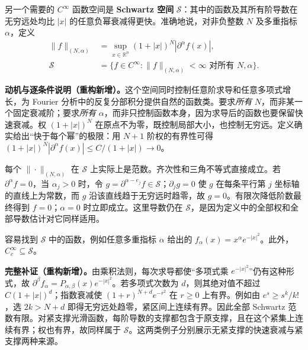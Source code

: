 \documentclass[../../main.tex]{subfiles}
\begin{document}
\begin{definition}[Schwartz 空间]\label{definition:ch08-schwartz-space}
另一个需要的 $C^\infty$ 函数空间是 \textbf{Schwartz 空间} $\mathcal S$：其中的函数及其所有阶导数在无穷远处均比 $|x|$ 的任意负幂衰减得更快。准确地说，对非负整数 $N$ 及多重指标 $\alpha$，定义
\begin{align*}
\|f\|_{(N,\alpha)}&=\sup_{x\in\mathbb R^n}(1+|x|)^N|\partial^\alpha f(x)|,\\
\mathcal S&=\{f\in C^\infty:\|f\|_{(N,\alpha)}<\infty\text{ 对所有 }N,\alpha\}.
\end{align*}
\end{definition}
\begin{remark}
\textbf{动机与逐条件说明（重构新增）。}这个空间同时控制任意阶求导和任意多项式增长，为 Fourier 分析中的反复分部积分提供自然的函数类。要求\emph{所有} $N$，而非某一个固定衰减阶；要求\emph{所有} $\alpha$，而非只控制函数本身，因为求导后的函数也要保留快速衰减。权 $(1+|x|)^N$ 在原点不为零，既控制局部大小，也控制无穷远。定义确实给出“快于每个幂”的极限：用 $N+1$ 阶权的有界性可得 $(1+|x|)^N|\partial^\alpha f(x)|\leqslant C/(1+|x|)\to0$。

每个 $\|\cdot\|_{(N,\alpha)}$ 在 $\mathcal S$ 上实际上是范数。齐次性和三角不等式直接成立。若 $\partial^\alpha f=0$，当 $\alpha_j>0$ 时，令 $g=\partial^{\alpha-e_j}f\in\mathcal S$；$\partial_jg=0$ 使 $g$ 在每条平行第 $j$ 坐标轴的直线上为常数，而 $g$ 沿该直线趋于无穷远时趋零，故 $g=0$。有限次降低阶数最终得到 $f=0$；$\alpha=0$ 时立即成立。这里导数仍在 $\mathcal S$，是因为定义中的全部权和全部导数估计对它同样适用。
\end{remark}
\begin{example}\label{example:ch08-schwartz-examples}
容易找到 $\mathcal S$ 中的函数，例如任意多重指标 $\alpha$ 给出的 $f_\alpha(x)=x^\alpha e^{-|x|^2}$。此外，$C_c^\infty\subseteq\mathcal S$。
\end{example}
\begin{remark}
\textbf{完整补证（重构新增）。}由乘积法则，每次求导都使“多项式乘 $e^{-|x|^2}$”仍有这种形式，故 $\partial^\beta f_\alpha=P_{\alpha,\beta}(x)e^{-|x|^2}$。若多项式次数为 $d$，则其绝对值不超过 $C(1+|x|)^d$；指数衰减使 $(1+r)^{N+d}e^{-r^2}$ 在 $r\geqslant0$ 上有界。例如由 $e^s\geqslant s^k/k!$，选 $2k>N+d$ 即得无穷远处趋零，紧区间上连续有界。因此全部 Schwartz 范数有限。对紧支撑光滑函数，每阶导数的支撑都包含于原支撑，且在这个紧集上连续有界；权也有界，故同样属于 $\mathcal S$。这两类例子分别展示无紧支撑的快速衰减与紧支撑两种来源。
\end{remark}
\end{document}
